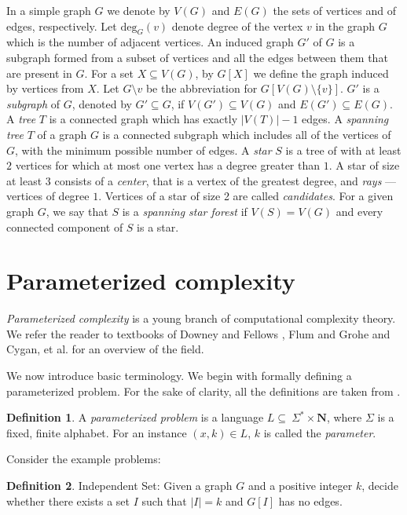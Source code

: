 \documentclass[en]{pracamgr}
\theoremstyle{definition}
\newtheorem{definition}{Definition}
\newcommand{\ssf}{spanning star forest}
\newcommand{\indset}{{\sc Independent Set}}
\newcommand{\degree}[2]{\textrm{deg}_{#1}(#2)}
\begin{document}
In a simple graph $G$ we denote by $V(G)$ and $E(G)$ the sets of vertices and of edges, respectively. 
Let $\degree{G}{v}$ denote degree of the vertex $v$ in the graph $G$ which is the number of adjacent vertices. 
An induced graph $G'$ of $G$ is a subgraph formed from a subset of vertices and all the edges between them that are present in $G$. 
For a set $X \subseteq V(G)$, by $G[X]$ we define the graph induced by vertices from $X$. 
Let $G \setminus v$ be the abbreviation for $G[V(G) \setminus \{v\}]$.
$G'$ is a \emph{subgraph} of $G$, denoted by $G' \subseteq G$, if $V(G') \subseteq V(G)$ and $E(G') \subseteq E(G)$.
A \emph{tree} $T$ is a connected graph which has exactly $|V(T)|-1$ edges. 
A \emph{spanning tree} $T$ of a graph $G$ is a connected subgraph which includes all of the vertices of $G$, with the minimum possible number of edges.
A \emph{star} $S$ is a tree of with at least $2$ vertices for which at most one vertex has a degree greater than $1$. 
A star of size at least $3$ consists of a \emph{center}, that is a vertex of the greatest degree, and \emph{rays} --- vertices of degree $1$. 
Vertices of a star of size 2 are called \emph{candidates}.
For a given graph $G$, we say that $S$ is a \emph{\ssf{}} if $V(S)=V(G)$ and every connected component of $S$ is a star.

\section{Parameterized complexity}

\emph{Parameterized complexity} is a young branch of computational complexity theory. We refer the reader to textbooks of Downey and Fellows \cite{ParComp}, Flum and Grohe \cite{ParCompThm} and Cygan, et al. \cite{ParAlg} for an overview of the field.

We now introduce basic terminology. We begin with formally defining a parameterized problem. For the sake of clarity, all the definitions are taken from \cite{ParAlg}.

\begin{definition}\label{Parameterized problem}
	A \textit{parameterized problem} is a language $L \subseteq \ \Sigma^* \times \mathbf{N}$, where $\Sigma$ is a fixed, finite alphabet. For an instance $(x,k) \in L$, $k$ is called the \textit{parameter}.
\end{definition}

\noindent
Consider the example problems:

\begin{definition}
	\indset{}: Given a graph $G$ and a positive integer $k$, decide whether there exists a set $I$ such that $|I|=k$ and $G[I]$ has no edges.
\end{definition}
\end{document}
